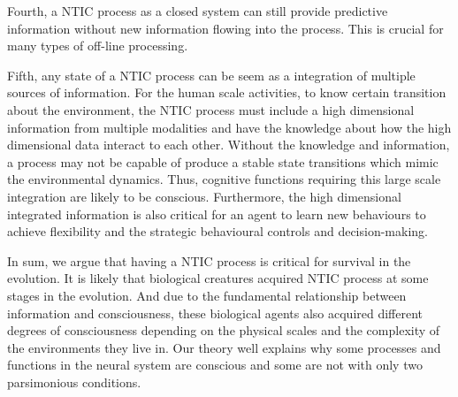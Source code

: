 \documentclass[utf8]{article}
\begin{document}
	    Fourth, a NTIC process as a closed system can still provide predictive information without new information flowing into the process. This is crucial for many types of off-line processing. 
	    
	    Fifth, any state of a NTIC process can be seem as a integration of multiple sources of information. For the human scale activities, to know certain transition about the environment, the NTIC process must include a high dimensional information from multiple modalities and have the knowledge about how the high dimensional data interact to each other. Without the knowledge and information, a process may not be capable of produce a stable state transitions which mimic the environmental dynamics. Thus, cognitive functions requiring this large scale integration are likely to be conscious. Furthermore, the high dimensional integrated information is also critical for an agent to learn new behaviours to achieve flexibility and the strategic behavioural controls and decision-making. 
	    
	    In sum, we argue that having a NTIC process is critical for survival in the evolution. It is likely that biological creatures acquired NTIC process at some stages in the evolution. And due to the fundamental relationship between information and consciousness, these biological agents also acquired different degrees of consciousness depending on the physical scales and the complexity of the environments they live in. Our theory well explains why some processes and functions in the neural system are conscious and some are not with only two parsimonious conditions. 
		
\end{document}
